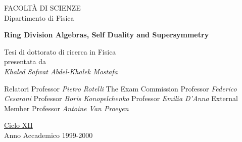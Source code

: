 \documentclass[a4paper,12pt]{book}
\begin{document}
\thispagestyle{empty}

\vspace*{-1.5truecm}

\hspace*{-0.6cm}%

\vspace{0.8cm}

\begin{center}
FACOLT\`A DI SCIENZE \\[0pt]
Dipartimento di Fisica \\[0pt]
\end{center}

\vspace{2cm}

\begin{center}
{\LARGE \textbf{Ring Division Algebras, Self Duality and Supersymmetry }}
\end{center}

\vspace{1.5cm}

\begin{center}
{\large Tesi di dottorato di ricerca in Fisica} \\[0pt]
presentata da \\[0pt]
{\large \emph{Khaled Safwat Abdel-Khalek Mostafa}}
\end{center}

\vspace{1.5cm} \noindent Relatori \newline
{\large Professor \emph{Pietro Rotelli}} \newline
The Exam Commission \newline
{\large Professor \emph{Federico Cesaroni}} \newline
{\large Professor \emph{Boris Konopelchenko}} \newline
{\large Professor \emph{Emilia D'Anna}} \newline
External Member \newline
{\large Professor \emph{Antoine Van Proeyen}} \newline

\vspace{1cm}

\begin{center}
\underline{Ciclo XII} \\[0pt]
\vspace{0.5cm} Anno Accademico 1999-2000
\end{center}
\end{document}

